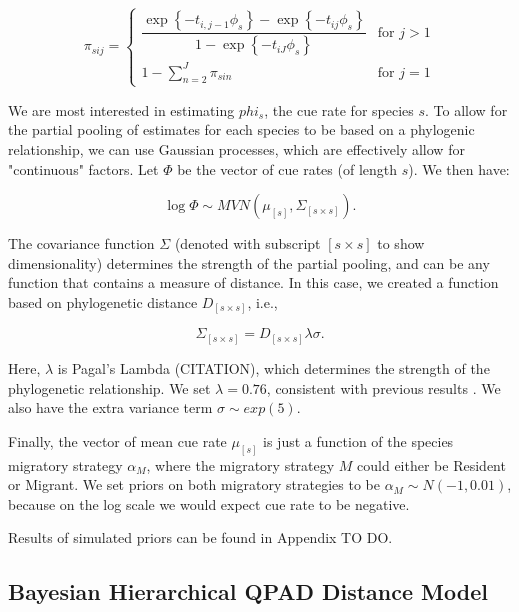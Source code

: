 \documentclass[12pt]{article}
\begin{document}
\begin{equation*}
	\pi_{sij} = 
	\begin{cases}
		\dfrac{\exp\left\{ -t_{i,j-1}\phi_{s} \right\} - \exp\left\{ -t_{ij}\phi_{s} \right\}}{1 - \exp\left\{ -t_{iJ}\phi_{s} \right\}} & \text{for } j > 1 \\
		1 - \sum_{n = 2}^{J} \pi_{sin} & \text{for } j = 1
	\end{cases}
\end{equation*}

\par We are most interested in estimating $phi_s$, the cue rate for species $s$. 
To allow for the partial pooling of estimates for each species to be based on a phylogenic relationship, we can use Gaussian processes, which are effectively allow for "continuous" factors. 
Let $\Phi$ be the vector of cue rates (of length $s$). 
We then have:

$$\log \Phi \sim MVN\left( \mu_{[s]}, \Sigma_{[s \times s]} \right).$$

\par The covariance function $\Sigma$ (denoted with subscript $[s \times s]$ to show dimensionality) determines the strength of the partial pooling, and can be any function that contains a measure of distance. 
In this case, we created a function based on phylogenetic distance $D_{[s \times s]}$, i.e.,

$$\Sigma_{[s \times s]} = D_{[s \times s]}\lambda\sigma.$$

\par Here, $\lambda$ is Pagal's Lambda (CITATION), which determines the strength of the phylogenetic relationship. 
We set $\lambda = 0.76$, consistent with previous results \cite{solymos_phylogeny_2018}. 
We also have the extra variance term $\sigma \sim exp(5)$.

\par Finally, the vector of mean cue rate $\mu_{[s]}$ is just a function of the species migratory strategy $\alpha_M$, where the migratory strategy $M$ could either be Resident or Migrant. 
We set priors on both migratory strategies to be $\alpha_M \sim N(-1, 0.01)$, because on the log scale we would expect cue rate to be negative. 

\par Results of simulated priors can be found in Appendix TO DO.

\subsection{Bayesian Hierarchical QPAD Distance Model}
\end{document}
